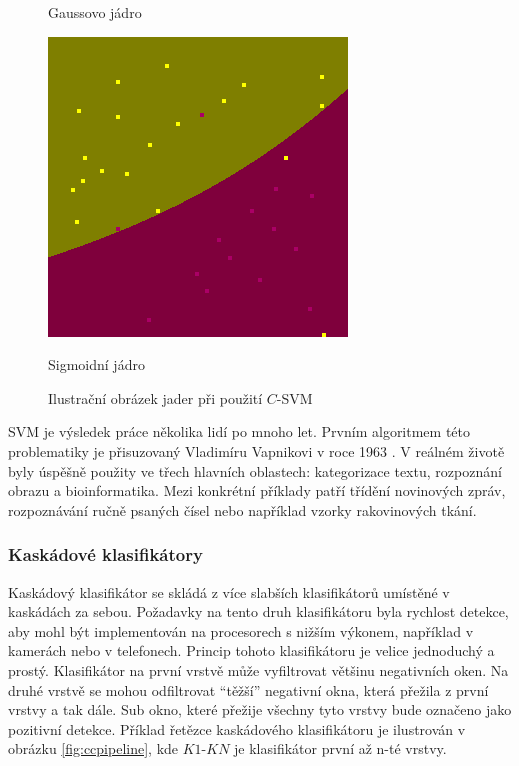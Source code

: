 \begin{figure}[ht]
\begin{minipage}[b]{0.5\linewidth}
    \caption*{Gaussovo jádro} 
    \vspace{4ex}
    \label{rbfKernel} 
  \end{minipage}%
  \begin{minipage}[b]{0.5\linewidth}
    \centering
    \includegraphics[width=.6\linewidth]{figures/sigm}
    \caption*{Sigmoidní jádro} 
    \vspace{4ex}
    \label{sigmKernel} 
  \end{minipage} 
  \caption{Ilustrační obrázek jader při použití $C$-SVM \cite{libsvm}}
  \label{kernels} 
\end{figure}

SVM je výsledek práce několika lidí po mnoho let. Prvním algoritmem této problematiky je přisuzovaný Vladimíru Vapnikovi v roce 1963 \cite{svm:vapnik}. V reálném životě byly úspěšně použity ve třech hlavních oblastech: kategorizace textu, rozpoznání obrazu a bioinformatika. Mezi konkrétní příklady patří třídění novinových zpráv, rozpoznávání ručně psaných čísel nebo například vzorky rakovinových tkání.

\subsubsection*{Kaskádové klasifikátory} %
Kaskádový klasifikátor se skládá z více slabších klasifikátorů umístěné v kaskádách za sebou. Požadavky na tento druh klasifikátoru byla rychlost detekce, aby mohl být implementován na procesorech s nižším výkonem, například v kamerách nebo v telefonech. Princip tohoto klasifikátoru je velice jednoduchý a prostý. Klasifikátor na první vrstvě může vyfiltrovat většinu negativních oken. Na druhé vrstvě se mohou odfiltrovat ``těžší'' negativní okna, která přežila z první vrstvy a tak dále. Sub okno, které přežije všechny tyto vrstvy bude označeno jako pozitivní detekce. Příklad řetězce kaskádového klasifikátoru je ilustrován v obrázku \ref{fig:ccpipeline}, kde $K1$-$KN$ je klasifikátor první až n-té vrstvy.

